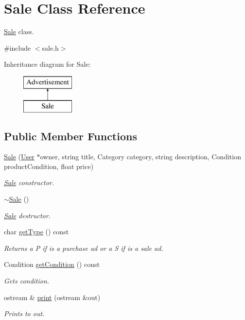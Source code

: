 \hypertarget{class_sale}{}\section{Sale Class Reference}
\label{class_sale}


\hyperlink{class_sale}{Sale} class.  




{\ttfamily \#include $<$sale.\+h$>$}

Inheritance diagram for Sale\+:\begin{figure}[H]
\begin{center}
\leavevmode
\includegraphics[height=2.000000cm]{class_sale}
\end{center}
\end{figure}
\subsection*{Public Member Functions}
\begin{DoxyCompactItemize}
\item 
\hyperlink{class_sale_ac8ff8ff1ab16deb6f12f1b3e63fcb310}{Sale} (\hyperlink{class_user}{User} $\ast$owner, string title, Category category, string description, Condition product\+Condition, float price)
\begin{DoxyCompactList}\small\item\em \hyperlink{class_sale}{Sale} constructor. \end{DoxyCompactList}\item 
\hypertarget{class_sale_ab6cb58a5d618fc4e4988b55342f21b21}{}\hyperlink{class_sale_ab6cb58a5d618fc4e4988b55342f21b21}{$\sim$\+Sale} ()\label{class_sale_ab6cb58a5d618fc4e4988b55342f21b21}

\begin{DoxyCompactList}\small\item\em \hyperlink{class_sale}{Sale} destructor. \end{DoxyCompactList}\item 
char \hyperlink{class_sale_ae105e16c4b41870d375c5b1442dc7031}{get\+Type} () const 
\begin{DoxyCompactList}\small\item\em Returns a P if is a purchase ad or a S if is a sale ad. \end{DoxyCompactList}\item 
Condition \hyperlink{class_sale_a5c65f4917d237370ab578307a124342f}{get\+Condition} () const 
\begin{DoxyCompactList}\small\item\em Gets condition. \end{DoxyCompactList}\item 
ostream \& \hyperlink{class_sale_a0b9e2e6bcc648d2471dc561a7eb3dcb4}{print} (ostream \&out)
\begin{DoxyCompactList}\small\item\em Prints to out. \end{DoxyCompactList}\end{DoxyCompactItemize}
